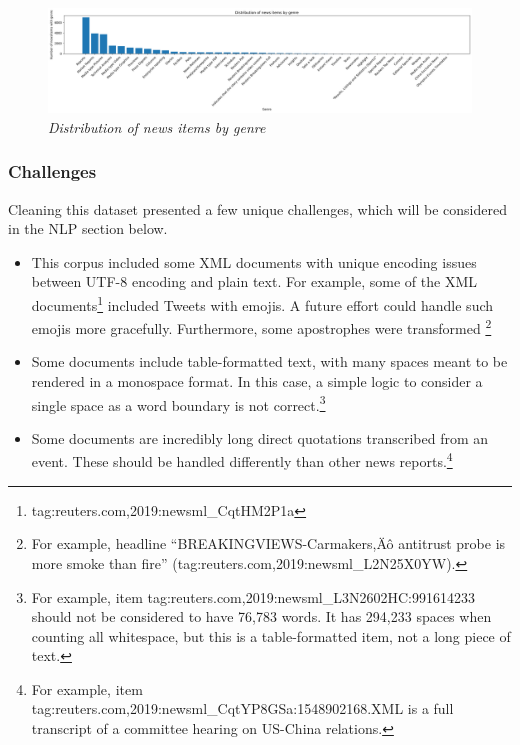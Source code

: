 \documentclass[11pt]{article}
\begin{document}
\begin{itemize}
{      \begin{figure}
        \centerline{\includegraphics[scale=0.3]{distribution_news_item_genre}}
        \caption{\textit{Distribution of news items by genre}}
      \end{figure}

      }
    \end{itemize}

    \subsubsection{Challenges}
    Cleaning this dataset presented a few unique challenges, which will be considered in the NLP section below.
    \begin{itemize}
      \item{This corpus included some XML documents with unique encoding issues between UTF-8 encoding and plain text. For example, some of the XML documents\footnote{tag:reuters.com,2019:newsml\_CqtHM2P1a} included Tweets with emojis. A future effort could handle such emojis more gracefully. Furthermore, some apostrophes were transformed \footnote{For example, headline ``BREAKINGVIEWS-Carmakers,\"A\^o antitrust probe is more smoke than fire'' (tag:reuters.com,2019:newsml\_L2N25X0YW).}
      }
      \item{Some documents include table-formatted text, with many spaces meant to be rendered in a monospace format. In this case, a simple logic to consider a single space as a word boundary is not correct.\footnote{For example, item tag:reuters.com,2019:newsml\_L3N2602HC:991614233 should not be considered to have 76,783 words. It has 294,233 spaces when counting all whitespace, but this is a table-formatted item, not a long piece of text.}}
      \item{Some documents are incredibly long direct quotations transcribed from an event. These should be handled differently than other news reports.\footnote{For example, item tag:reuters.com,2019:newsml\_CqtYP8GSa:1548902168.XML is a full transcript of a committee hearing on US-China relations.}}
    \end{itemize}
\end{document}
